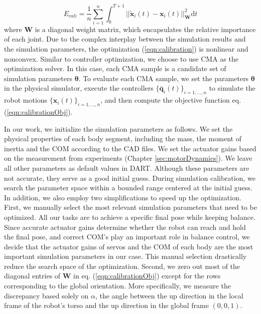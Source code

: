 \begin{equation}
  E_{cali}=\frac{1}{n}\sum_{i=1}^{n}\int_{0}^{T+1}||\tilde{\mathbf{x}}_i(t)-\mathbf{x}_i(t)||_{\mathbf{W}}^2\mathrm{d}t
  \label{eqn:calibrationObj}
\end{equation}
where $\mathbf{W}$ is a diagonal weight matrix, which encapsulates the relative importance of each joint. Due to the complex interplay between the simulation results and the simulation parameters, the optimization (\ref{eqn:calibration}) is nonlinear and nonconvex. Similar to controller optimization, we choose to use CMA as the optimization solver. In this case, each CMA sample is a candidate set of simulation parameters $\mathbf{\theta}$. To evaluate each CMA sample, we set the parameters $\mathbf{\theta}$ in the physical simulator, execute the controllers $\{\bar{\mathbf{q}}_i(t)\}_{i=1,...,n}$ to simulate the robot motions $\{\mathbf{x}_i(t)\}_{i=1,...,n}$, and then compute the objective function eq. (\ref{eqn:calibrationObj}).

In our work, we initialize the simulation parameters as follows. We set the physical properties of each body segment, including the mass, the moment of inertia and the COM according to the CAD files. We set the actuator gains based on the measurement from experiments (Chapter \ref{sec:motorDynamics}). We leave all other parameters as default values in DART. Although these parameters are not accurate, they serve as a good initial guess. During simulation calibration, we search the parameter space within a bounded range centered at the initial guess. In addition, we also employ two simplifications to speed up the optimization. First, we manually select the most relevant simulation parameters that need to be optimized. All our tasks are to achieve a specific final pose while keeping balance. Since accurate actuator gains determine whether the robot can reach and hold the final pose, and correct COM's play an important role in balance control, we decide that the actuator gains of servos and the COM of each body are the most important simulation parameters in our case. This manual selection drastically reduce the search space of the optimization. Second, we zero out most of the diagonal entries of $\mathbf{W}$ in eq. (\ref{eqn:calibrationObj}) except for the rows corresponding to the global orientation. More specifically, we measure the discrepancy based solely on $\alpha$, the angle between the up direction in the local frame of the robot's torso and the up direction in the global frame $(0,0,1)$.

